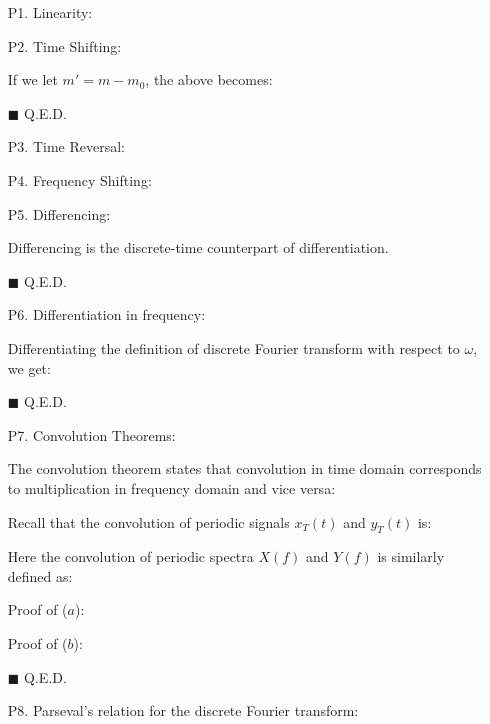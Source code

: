 	\begin{enumerate}
	\item[P1.] Linearity:
	
	
	\item[P2.] Time Shifting:
	
	\begin{dem}
	
	If we let $m'=m-m_0$, the above becomes:
	
	\begin{flushright}
		$\blacksquare$  Q.E.D.
	\end{flushright}
	\end{dem}
	
	
	\item[P3.] Time Reversal:
	
	
	
	\item[P4.] Frequency Shifting:
	
	
	\item[P5.] Differencing:
	
	Differencing is the discrete-time counterpart of differentiation.
	
	\begin{dem}
	
	\begin{flushright}
		$\blacksquare$  Q.E.D.
	\end{flushright}
	\end{dem}
	
	
	\item[P6.] Differentiation in frequency:
	
	
	\begin{dem}
	Differentiating the definition of discrete Fourier transform with respect to 	$\omega$, we get:
	
	\begin{flushright}
		$\blacksquare$  Q.E.D.
	\end{flushright}
	\end{dem}
	
	\item[P7.] Convolution Theorems:
	
	The convolution theorem states that convolution in time domain corresponds to multiplication in frequency domain and vice versa:
	
	
	Recall that the convolution of periodic signals $x_T(t)$ and $y_T(t)$ is:
	
	Here the convolution of periodic spectra $X(f)$ and $Y(f)$ is similarly defined as:
	
	
	Proof of ($a$): 
	
	
	Proof of ($b$):
	
	\begin{flushright}
		$\blacksquare$  Q.E.D.
	\end{flushright}
	
	\item[P8.] Parseval's relation for the discrete Fourier transform:
	
	\end{enumerate}
	
